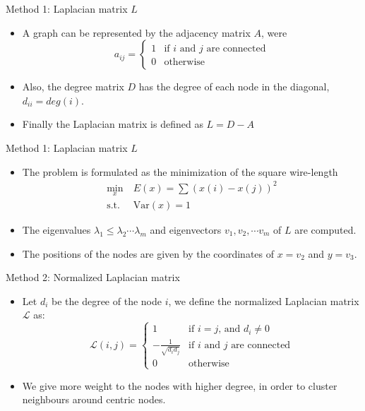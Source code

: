 \documentclass[serif, 12pt]{beamer}
\begin{document}
\begin{frame}{Method 1: Laplacian matrix $L$}

\begin{itemize}
\item A graph can be represented by the adjacency matrix $A$, were
$$ a_{ij} =
\begin{cases}
	1 & \text{if $i$ and $j$ are connected} \\
	0 & \text{otherwise}
\end{cases}
$$
\item Also, the degree matrix $D$ has the degree of each node in the diagonal, 
$d_{ii} = deg(i)$.

\item Finally the Laplacian matrix is defined as $L = D - A$
\end{itemize}

\end{frame}

\begin{frame}{Method 1: Laplacian matrix $L$}


\begin{itemize}

\item The problem is formulated as the minimization of the square wire-length
\begin{equation}
\begin{split}
\min_x \  & E(x) = \sum (x(i) - x(j))^2 \\
\textrm{s.t.} \ & \textrm{Var}(x) = 1
\end{split}
\end{equation}
\item The eigenvalues $\lambda_1 \le \lambda_2 \cdots \lambda_m$ and 
eigenvectors $v_1, v_2, \cdots v_m$ of $L$ are computed.

\item The positions of the nodes are given by the coordinates of $x = v_2$ and 
$y = v_3$.
\end{itemize}

\end{frame}

\begin{frame}{Method 2: Normalized Laplacian matrix}

\begin{itemize}
\item Let $d_i$ be the degree of the node $i$, we define the normalized 
Laplacian matrix $\mathcal{L}$ as:
$$ \mathcal{L}(i,j) =
\begin{cases}
	1 & \text{if $i = j$, and $d_i \neq 0$} \\
	-\frac{1}{\sqrt{d_i d_j}} & \text{if $i$ and $j$ are connected} \\
	0 & \text{otherwise}
\end{cases}
$$

\item We give more weight to the nodes with higher degree, in order to cluster 
neighbours around centric nodes.
\end{itemize}

\end{frame}
\end{document}
